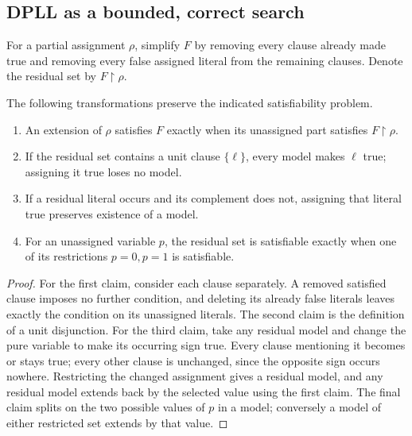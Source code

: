 \subsection{DPLL as a bounded, correct search}

For a partial assignment $\rho$, simplify $F$ by removing every clause already
made true and removing every false assigned literal from the remaining
clauses.  Denote the residual set by $F\!\upharpoonright\!\rho$.

\begin{lemma}
\label{ca-dpll-rules}
The following transformations preserve the indicated satisfiability problem.
\begin{enumerate}
 \item An extension of $\rho$ satisfies $F$ exactly when its unassigned part
       satisfies $F\!\upharpoonright\!\rho$.
 \item If the residual set contains a unit clause $\{\ell\}$, every model
       makes $\ell$ true; assigning it true loses no model.
 \item If a residual literal occurs and its complement does not, assigning
       that literal true preserves existence of a model.
 \item For an unassigned variable $p$, the residual set is satisfiable
       exactly when one of its restrictions $p=0,p=1$ is satisfiable.
\end{enumerate}
\end{lemma}
\begin{proof}
For the first claim, consider each clause separately.  A removed satisfied
clause imposes no further condition, and deleting its already false literals
leaves exactly the condition on its unassigned literals.  The second claim
is the definition of a unit disjunction.  For the third claim, take any
residual model and change the pure variable to make its occurring sign true.
Every clause mentioning it becomes or stays true; every other clause is
unchanged, since the opposite sign occurs nowhere.  Restricting the changed
assignment gives a residual model, and any residual model extends back by
the selected value using the first claim.  The final claim splits on the
two possible values of $p$ in a model; conversely a model of either restricted
set extends by that value.
\end{proof}

